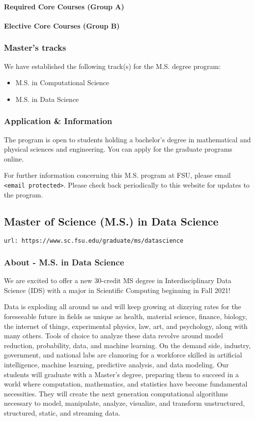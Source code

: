 \documentclass[12pt,a4paper]{article}
\begin{document}
\paragraph{Required Core Courses (Group A)}
\paragraph{Elective Core Courses (Group B)}

\subsubsection*{Master's tracks}
We have established the following track(s) for the M.S. degree program:
\begin{itemize}
    \item M.S. in Computational Science
    \item M.S. in Data Science
\end{itemize}

\subsubsection*{Application \& Information}
The program is open to students holding a bachelor's degree in mathematical and physical sciences and engineering. You can apply for the graduate programs online.

For further information concerning this M.S. program at FSU, please email \texttt{<email protected>}. Please check back periodically to this website for updates to the program.

\subsection{Master of Science (M.S.) in Data Science}
\texttt{url: https://www.sc.fsu.edu/graduate/ms/datascience}

\subsubsection*{About - M.S. in Data Science}
We are excited to offer a new 30-credit MS degree in Interdisciplinary Data Science (IDS) with a major in Scientific Computing beginning in Fall 2021!

Data is exploding all around us and will keep growing at dizzying rates for the foreseeable future in fields as unique as health, material science, finance, biology, the internet of things, experimental physics, law, art, and psychology, along with many others. Tools of choice to analyze these data revolve around model reduction, probability, data, and machine learning. On the demand side, industry, government, and national labs are clamoring for a workforce skilled in artificial intelligence, machine learning, predictive analysis, and data modeling. Our students will graduate with a Master’s degree, preparing them to succeed in a world where computation, mathematics, and statistics have become fundamental necessities. They will create the next generation computational algorithms necessary to model, manipulate, analyze, visualize, and transform unstructured, structured, static, and streaming data.
\end{document}
